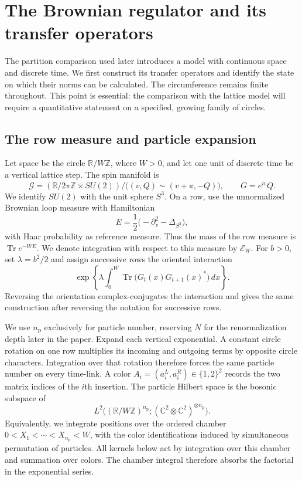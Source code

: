 \section{The Brownian regulator and its transfer operators}
\label{sec:brownian}

The partition comparison used later introduces a model with continuous space
and discrete time.  We first construct its transfer operators and identify the
state on which their norms can be calculated.  The circumference remains
finite throughout.  This point is essential: the comparison with the lattice
model will require a quantitative statement on a specified, growing family
of circles.

\subsection{The row measure and particle expansion}

Let space be the circle $\mathbb R/W\mathbb Z$, where $W>0$, and let one unit
of discrete time be a vertical lattice step.  The spin manifold is
\[
 \mathcal G=(\mathbb R/2\pi\mathbb Z\times SU(2))/
       \bigl((v,Q)\sim(v+\pi,-Q)\bigr),
 \qquad G=e^{iv}Q.
\]
We identify $SU(2)$ with the unit sphere $S^3$.  On a row, use the
unnormalized Brownian loop measure with Hamiltonian
\[
 E=\frac12\bigl(-\partial_v^2-\Delta_{S^3}\bigr),
\]
with Haar probability as reference measure.  Thus the mass of the row
measure is $\operatorname{Tr}e^{-WE}$.  We denote integration with respect to
this measure by $\mathcal E_W$.  For $b>0$, set $\lambda=b^2/2$ and assign
successive rows the oriented interaction
\[
 \exp\left\{\lambda\int_0^W
                \operatorname{Tr}\bigl(G_t(x)G_{t+1}(x)^*\bigr)\,dx\right\}.
\]
Reversing the orientation complex-conjugates the interaction and gives the
same construction after reversing the notation for successive rows.

We use $n_{\mathrm p}$ exclusively for particle number, reserving $N$ for the
renormalization depth later in the paper.  Expand each vertical exponential.
A constant circle rotation on one row multiplies its incoming and outgoing
terms by opposite circle characters.  Integration over that rotation
therefore forces the same particle number on every time-link.  A color
$A_i=(a_i^L,a_i^R)\in\{1,2\}^2$ records the two matrix indices of the $i$th
insertion.  The particle Hilbert space is the bosonic subspace of
\[
 L^2\bigl((\mathbb R/W\mathbb Z)^{n_{\mathrm p}};
                     (\mathbb C^2\otimes\mathbb C^2)^{\otimes n_{\mathrm p}}\bigr).
\]
Equivalently, we integrate positions over the ordered chamber
$0<X_1<\cdots<X_{n_{\mathrm p}}<W$, with the color identifications induced
by simultaneous permutation of particles.  All kernels below act by
integration over this chamber and summation over colors.  The chamber
integral therefore absorbs the factorial in the exponential series.

